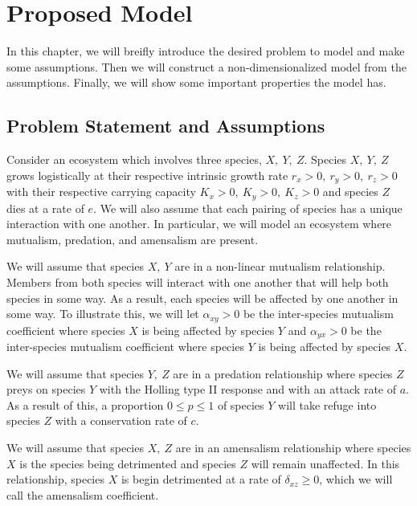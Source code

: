 % 
\chapter{Proposed Model}\label{ch:proposed-model}
In this chapter, we will breifly introduce the desired problem to model and make some assumptions. Then we will construct a non-dimensionalized model from the assumptions. Finally, we will show some important properties the model has.

\section{Problem Statement and Assumptions}
Consider an ecosystem which involves three species, $X,\ Y,\ Z$. Species $X,\ Y,\ Z$ grows logistically at their respective intrinsic growth rate $r_x>0,\ r_y>0,\ r_z>0$ with their respective carrying capacity $K_x>0,\ K_y>0,\ K_z>0$ and species $Z$ dies at a rate of $e$. We will also assume that each pairing of species has a unique interaction with one another. In particular, we will model an ecosystem where mutualism, predation, and amensalism are present. %

We will assume that species $X,\ Y$ are in a non-linear mutualism relationship. Members from both species will interact with one another that will help both species in some way. As a result, each species will be affected by one another in some way. To illustrate this, we will let $\alpha_{xy} > 0$ be the inter-species mutualism coefficient where species $X$ is being affected by species $Y$ and $\alpha_{yx} > 0$ be the inter-species mutualism coefficient where species $Y$ is being affected by species $X$.

We will assume that species $Y,\ Z$ are in a predation relationship where species $Z$ preys on species $Y$ with the Holling type II response and with an attack rate of $a$. As a result of this, a proportion $0 \leq p \leq 1$ of species $Y$ will take refuge into species $Z$ with a conservation rate of $c$. 

We will assume that species $X,\ Z$ are in an amensalism relationship where species $X$ is the species being detrimented and species $Z$ will remain unaffected. In this relationship, species $X$ is begin detrimented at a rate of $\delta_{xz} \geq 0$, which we will call the amensalism coefficient. 

